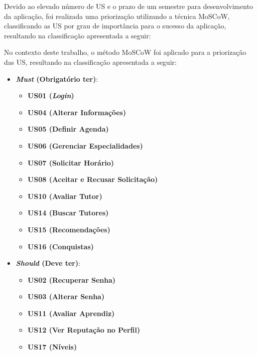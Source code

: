 Devido ao elevado número de US e o prazo de um semestre para desenvolvimento da aplicação, foi realizada uma priorização utilizando a técnica MoSCoW, classificando as US por grau de importância para o sucesso da aplicação, resultando na classificação apresentada a seguir:

No contexto deste trabalho, o método MoSCoW foi aplicado para a priorização das US, resultando na classificação apresentada a seguir:

\begin{itemize}

\item \textbf{\textit{Must} (Obrigatório ter)}:

\begin{itemize}

\item \textbf{US01 (\textit{Login})} 

\item \textbf{US04 (Alterar Informações)}

\item \textbf{US05 (Definir Agenda)}

\item \textbf{US06 (Gerenciar Especialidades)}

\item \textbf{US07 (Solicitar Horário)}

\item \textbf{US08 (Aceitar e Recusar Solicitação)}

\item \textbf{US10 (Avaliar Tutor)}

\item \textbf{US14 (Buscar Tutores)}

\item \textbf{US15 (Recomendações)}

\item \textbf{US16 (Conquistas)}

\end{itemize}

\end{itemize}

\begin{itemize}

\item \textbf{\textit{Should} (Deve ter)}:

\begin{itemize}

\item \textbf{US02 (Recuperar Senha)}

\item \textbf{US03 (Alterar Senha)}

\item \textbf{US11 (Avaliar Aprendiz)}

\item \textbf{US12 (Ver Reputação no Perfil)}

\item \textbf{US17 (Níveis)}

\end{itemize}

\end{itemize}

